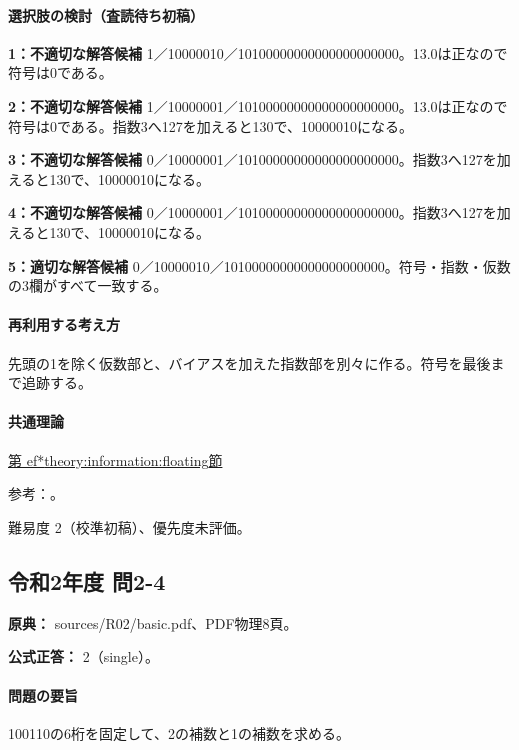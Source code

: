 \paragraph{選択肢の検討（査読待ち初稿）}

\noindent\textbf{1：不適切な解答候補} 1／10000010／10100000000000000000000。13.0は正なので符号は0である。\par

\noindent\textbf{2：不適切な解答候補} 1／10000001／10100000000000000000000。13.0は正なので符号は0である。指数3へ127を加えると130で、10000010になる。\par

\noindent\textbf{3：不適切な解答候補} 0／10000001／10100000000000000000000。指数3へ127を加えると130で、10000010になる。\par

\noindent\textbf{4：不適切な解答候補} 0／10000001／10100000000000000000000。指数3へ127を加えると130で、10000010になる。\par

\noindent\textbf{5：適切な解答候補} 0／10000010／10100000000000000000000。符号・指数・仮数の3欄がすべて一致する。\par

\paragraph{再利用する考え方} 先頭の1を除く仮数部と、バイアスを加えた指数部を別々に作る。符号を最後まで追跡する。

\paragraph{共通理論} \hyperref[theory:information:floating]{第
ef*{theory:information:floating}節}

\par 参考：\cite{oracle_single}。

\par 難易度 2（校準初稿）、優先度未評価。

\subsection{令和2年度 問2-4}
\label{q:r02-reg-basic-2-4}

\noindent\textbf{原典：} sources/R02/basic.pdf、PDF物理8頁。

\textbf{公式正答：} 2（single）。

\paragraph{問題の要旨} 100110の6桁を固定して、2の補数と1の補数を求める。

